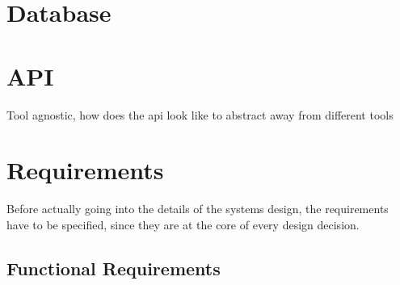 \section{Database}
\section{API}
Tool agnostic, how does the api look like to abstract away from different tools

\section{Requirements}
Before actually going into the details of the systems design, the requirements have to be specified, since they are at the core of every design decision.  

\subsection{Functional Requirements}
